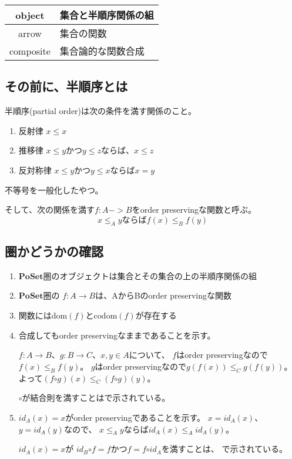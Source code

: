\documentclass[a4j,9pt]{jsarticle}
\newcommand{\dom}[1]{\ensuremath{\mathrm{dom}(#1)}}
\newcommand{\codom}[1]{\ensuremath{\mathrm{codom}(#1)}}
\newcommand{\comp}{\ensuremath{\mathrm{\circ}}}
\newcommand{\id}[1]{\ensuremath{\mathit{id}_{#1}}}
\newcommand{\PoSet}{\ensuremath{\mathbf{PoSet}圏}}
\begin{document}
\begin{tabular}{|c|l|}
\hline
object & 集合と半順序関係の組 \\\hline
arrow  & 集合の関数 \\\hline
composite & 集合論的な関数合成 \\\hline
\end{tabular}


\subsection{その前に、半順序とは}
半順序(partial order)は次の条件を満す関係のこと。

\begin{enumerate}
\item 反射律 $x \le x$
\item 推移律 $x \le y$かつ$y \le z$ならば、$x \le z$
\item 反対称律 $x \le y$かつ$y \le x$ならば$x = y$
\end{enumerate}

不等号を一般化したやつ。

そして、次の関係を満す$f : A -> B$をorder preservingな関数と呼ぶ。
\[
x \le_A y ならば f(x) \le_B f(y)
\]

\subsection{圏かどうかの確認}
\begin{enumerate}
\item \PoSet のオブジェクトは集合とその集合の上の半順序関係の組
\item \PoSet の $f : A \to B$は、AからBのorder preservingな関数
\item 関数には\dom{f}と\codom{f}が存在する
\item 合成してもorder preservingなままであることを示す。

$f : A \to B$、$ g : B \to C$、$x,y \in A$について、
$f$はorder preservingなので$f(x) \le_B f(y)$。
$g$はorder preservingなので$g(f(x)) \le_C g(f(y))$。
よって$(f \comp g)(x)\le_C (f \comp g)(y)$。

\comp が結合則を満すことはで示されている。

\item $id_A(x)= x$がorder preservingであることを示す。
$x = id_A(x)$、$y = id_A(y)$なので、
$x \le_A y$ならば$id_A(x) \le_A id_A(y)$。

$id_A(x) = x$が
$\id{B} \comp f = f$かつ$f = f \comp \id{A}$を満すことは、
で示されている。
\end{enumerate}
\end{document}
